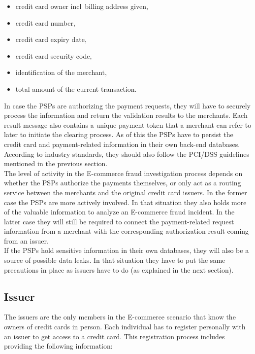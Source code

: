 \begin{itemize}
		\item credit card owner \gls{incl}\ billing address given,
		\item credit card number,
		\item credit card expiry date,
		\item credit card security code,
		\item identification of the merchant,
		\item total amount of the current transaction.
\end{itemize}

In case the \gls{PSP}s are authorizing the payment requests, they will have to securely process the information and return the validation results to the merchants. Each result message also contains a unique payment token that a merchant can refer to later to initiate the clearing process. As of this the \gls{PSP}s have to persist the credit card and payment-related information in their own back-end databases. According to industry standards, they should also follow the \gls{PCI/DSS} guidelines mentioned in the previous section. \\

The level of activity in the \gls{E-commerce} fraud investigation process depends on whether the \gls{PSP}s authorize the payments themselves, or only act as a routing service between the merchants and the original credit card issuers. In the former case the \gls{PSP}s are more actively involved. In that situation they also holds more of the valuable information to analyze an \gls{E-commerce} fraud incident. In the latter case they will still be required to connect the payment-related request information from a merchant with the corresponding authorization result coming from an issuer. \\

If the \gls{PSP}s hold sensitive information in their own databases, they will also be a source of possible data leaks. In that situation they have to put the same precautions in place as issuers have to do (as explained in the next section).


\subsection{Issuer}
\label{subsec:stakeholder_issuer}

The issuers are the only members in the \gls{E-commerce} scenario that know the owners of credit cards in person. Each individual has to register personally with an issuer to get access to a credit card. This registration process includes providing the following information: \@

